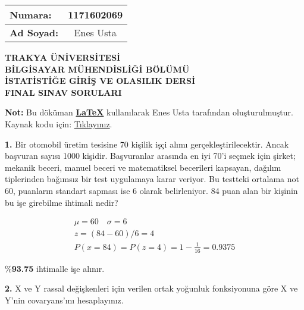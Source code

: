 \documentclass[a4paper,10pt]{article}
\begin{document}
  \begin{tabular}{ | l  c | }
    \hline
    \textbf{Numara:} & 1171602069 \\ \hline
    \textbf{Ad Soyad:} & Enes Usta \\
    \hline
  \end{tabular}

\begin{center}
\textbf{TRAKYA ÜNİVERSİTESİ} \\
\textbf{BİLGİSAYAR MÜHENDİSLİĞİ BÖLÜMÜ} \\
\textbf{İSTATİSTİĞE GİRİŞ VE OLASILIK DERSİ} \\
\textbf{FINAL SINAV SORULARI}
\end{center}

\begin{center}
\textbf{Not:} Bu döküman \href{https://en.wikipedia.org/wiki/LaTeX}{\textbf{LaTeX}} kullanılarak Enes Usta tarafından oluşturulmuştur.
Kaynak kodu için: \href{https://github.com/enesusta/bahar-donemi-final/blob/master/istatistik.tex}{Tıklayınız}.
\end{center}

\vspace{0.5cm}

\textbf{1.} Bir otomobil üretim tesisine 70 kişilik işçi alımı gerçekleştirilecektir. Ancak başvuran sayısı 1000 kişidir.
Başvuranlar arasında en iyi 70'i seçmek için şirket; mekanik beceri, manuel beceri ve matematiksel
becerileri kapsayan, dağılım tiplerinden bağımsız bir test uygulamaya karar veriyor. Bu testteki ortalama
not 60, puanların standart sapması ise 6 olarak belirleniyor. 84 puan alan bir kişinin bu işe girebilme
ihtimali nedir?

\vspace{1cm}

$$\begin{array}{l}
\mu=60 \quad \sigma=6 \\
z=(84-60) / 6=4 \\
P(x=84)=P(z=4)=1-\frac{1}{16}=0.9375
\end{array}$$

\begin{center}
\%\textbf{93.75} ihtimalle işe alınır.
\end{center}

\vspace{1cm}

\textbf{2.} X ve Y rassal değişkenleri için verilen ortak yoğunluk fonksiyonuna göre X ve Y’nin covaryans’ını
hesaplayınız.
\end{document}
